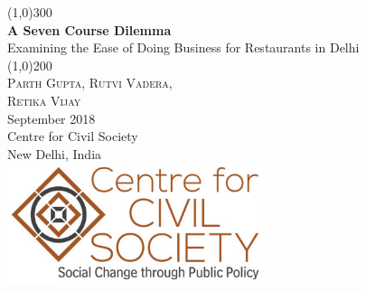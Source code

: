 \documentclass[a4paper, 12pt]{article}
\begin{document}
                    
                    \begin{titlepage}
                    	\begin{center}
                    	\line(1,0){300}\\
                    	[0.25in]
                    	\huge{\bfseries \textcolor{CCSbrown} {A Seven Course Dilemma}} \\
    	[0.5cm]
    	\large  {Examining the Ease of Doing Business for Restaurants in Delhi} \\
    	
                    	\line(1,0){200}\\
                    	[1in]
                    	\textsc{\Large Parth Gupta, Rutvi Vadera, \\ Retika Vijay} \\
                    	[1.5cm]
                    	{\Large September 2018} \\
                    	[2.0cm]
                    	{\LARGE Centre for Civil Society} \\
                    	[0.1mm]
                    	{\Large New Delhi, India} \\
    	[2.0cm]
    	 \includegraphics[width = 75mm]{CCSlogo.jpg}
      
                    	\end{center}
                    \end{titlepage}

                    
                                       
                 
                    \tableofcontents
                    
                    
                   \newpage
                   
\end{document}
